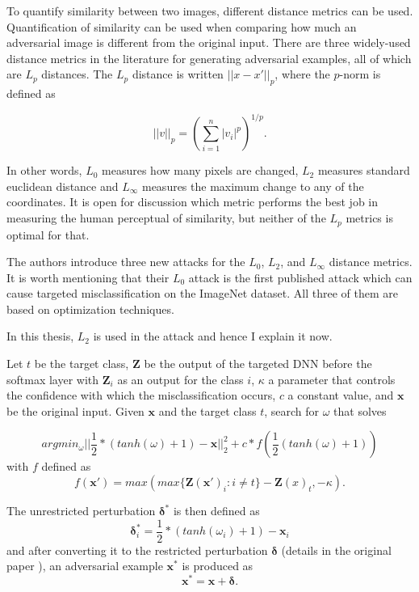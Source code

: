 
To quantify similarity between two images, different distance metrics can be used. Quantification of similarity can be used when comparing how much an adversarial image is different from the original input. There are three widely-used distance metrics in the literature for generating adversarial examples, all of which are $L_p$ distances. The $L_p$ distance is written $||x - x'||_p$, where the $p$-norm is defined as

\[
||v||_p =( \sum_{i = 1}^{n} |v_i|^p)^{1/p}. 
\]

In other words, $L_0$ measures how many pixels are changed, $L_2$ measures standard euclidean distance and $L_\infty$ measures the maximum change to any of the coordinates. It is open for discussion which metric performs the best job in measuring the human perceptual of similarity, but neither of the $L_p$ metrics is optimal for that.


The authors \cite{DBLP:journals/corr/CarliniW16a} introduce three new attacks for the $L_0$, $L_2$, and $L_{ \infty }$ distance metrics. It is worth mentioning that their $L_0$ attack is the first published attack which can cause targeted misclassification on the ImageNet dataset. All three of them are based on optimization techniques.

In this thesis, $L_2$ is used in the attack and hence I explain it now.

Let $t$ be the target class, $\pmb Z$ be the output of the targeted DNN before the softmax layer with $\pmb Z_i$ as an output for the class $i$, $\kappa$ a parameter that controls the confidence with which the misclassification occurs, $c$ a constant value, and $\pmb x$ be the original input.
Given $\pmb x$ and the target class $t$, search for $\omega$ that solves

\[
argmin_{\omega} ||\frac{1}{2}*(tanh(\omega) + 1) - \pmb x||_2^2 + c * f(\frac{1}{2}(tanh(\omega) + 1))
\]
with $f$ defined as 
\[
f(\pmb x') = max(max\{\pmb Z(\pmb x ')_i : i \neq t\} - \pmb Z(x)_t, - \kappa).
\]

The unrestricted perturbation $\pmb \delta^*$ is then defined as 
\[
	\pmb \delta^*_i = \frac{1}{2} * (tanh ( \omega_i) + 1) - \pmb x_i
\]
and after converting it to the restricted perturbation $\pmb \delta$ (details in the original paper \cite{DBLP:journals/corr/CarliniW16a}), an adversarial example $\pmb x^*$ is produced as 
\[
\pmb x^* = \pmb x +\pmb  \delta.
\]

